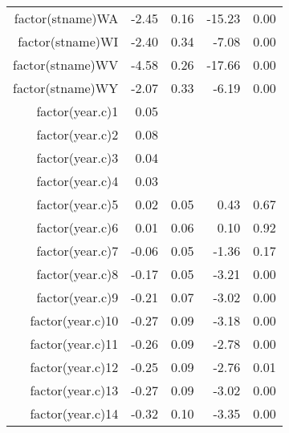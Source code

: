 \begin{table}[ht]
\begin{tabular}{rrrrr}
  factor(stname)WA & -2.45 & 0.16 & -15.23 & 0.00 \\ 
  factor(stname)WI & -2.40 & 0.34 & -7.08 & 0.00 \\ 
  factor(stname)WV & -4.58 & 0.26 & -17.66 & 0.00 \\ 
  factor(stname)WY & -2.07 & 0.33 & -6.19 & 0.00 \\ 
  factor(year.c)1 & 0.05 &  &  &  \\ 
  factor(year.c)2 & 0.08 &  &  &  \\ 
  factor(year.c)3 & 0.04 &  &  &  \\ 
  factor(year.c)4 & 0.03 &  &  &  \\ 
  factor(year.c)5 & 0.02 & 0.05 & 0.43 & 0.67 \\ 
  factor(year.c)6 & 0.01 & 0.06 & 0.10 & 0.92 \\ 
  factor(year.c)7 & -0.06 & 0.05 & -1.36 & 0.17 \\ 
  factor(year.c)8 & -0.17 & 0.05 & -3.21 & 0.00 \\ 
  factor(year.c)9 & -0.21 & 0.07 & -3.02 & 0.00 \\ 
  factor(year.c)10 & -0.27 & 0.09 & -3.18 & 0.00 \\ 
  factor(year.c)11 & -0.26 & 0.09 & -2.78 & 0.00 \\ 
  factor(year.c)12 & -0.25 & 0.09 & -2.76 & 0.01 \\ 
  factor(year.c)13 & -0.27 & 0.09 & -3.02 & 0.00 \\ 
  factor(year.c)14 & -0.32 & 0.10 & -3.35 & 0.00 \\ 
   \hline
\end{tabular}
\end{table}
